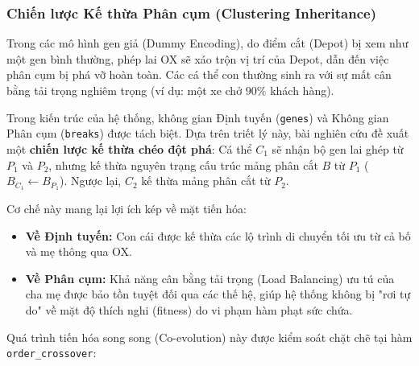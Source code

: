 \documentclass[12pt,a4paper]{article}
\numberwithin{figure}{subsection}
\numberwithin{table}{subsection}
\begin{document}
\subsubsection{Chiến lược Kế thừa Phân cụm (Clustering Inheritance)}

Trong các mô hình gen giả (Dummy Encoding), do điểm cắt (Depot) bị xem như một gen bình thường, phép lai OX sẽ xáo trộn vị trí của Depot, dẫn đến việc phân cụm bị phá vỡ hoàn toàn. Các cá thể con thường sinh ra với sự mất cân bằng tải trọng nghiêm trọng (ví dụ: một xe chở $90\%$ khách hàng).

Trong kiến trúc của hệ thống, không gian Định tuyến (\texttt{genes}) và Không gian Phân cụm (\texttt{breaks}) được tách biệt. Dựa trên triết lý này, bài nghiên cứu đề xuất một \textbf{chiến lược kế thừa chéo đột phá}: Cá thể $C_1$ sẽ nhận bộ gen lai ghép từ $P_1$ và $P_2$, nhưng kế thừa nguyên trạng cấu trúc mảng phân cắt $B$ từ $P_1$ ($B_{C_1} \gets B_{P_1}$). Ngược lại, $C_2$ kế thừa mảng phân cắt từ $P_2$.

\noindent Cơ chế này mang lại lợi ích kép về mặt tiến hóa: 
\begin{itemize}[label={ $\circ$}, leftmargin=1.5cm]
    \item \textbf{Về Định tuyến:} Con cái được kế thừa các lộ trình di chuyển tối ưu từ cả bố và mẹ thông qua OX.
    \item \textbf{Về Phân cụm:} Khả năng cân bằng tải trọng (Load Balancing) ưu tú của cha mẹ được bảo tồn tuyệt đối qua các thế hệ, giúp hệ thống không bị "rơi tự do" về mặt độ thích nghi (fitness) do vi phạm hàm phạt sức chứa.
\end{itemize}

\noindent Quá trình tiến hóa song song (Co-evolution) này được kiểm soát chặt chẽ tại hàm \texttt{order\_crossover}:
\end{document}
